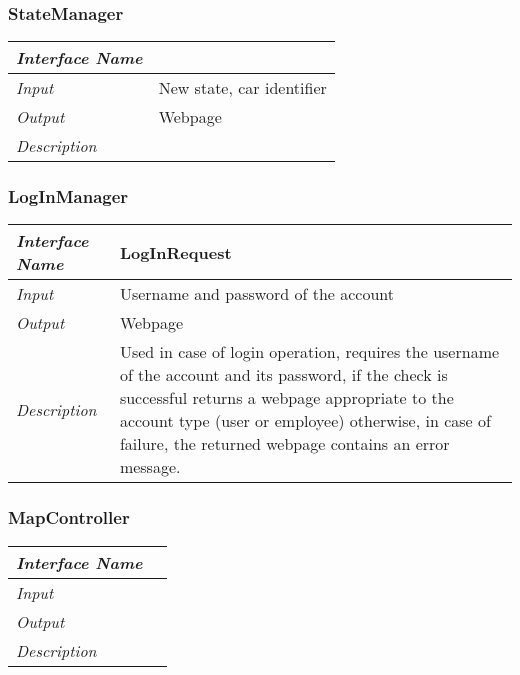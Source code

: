 \documentclass[11pt,a4paper]{report}
\begin{document}
\subsubsection{StateManager}
\begin{tabularx}{\textwidth}{|>{\em}l|X|}
	\hline
	Interface Name& \\
	\hline
	Input& New state, car identifier\\
	\hline
	Output & Webpage\\
	\hline
	Description &\\
	\hline
\end{tabularx}

\subsubsection{LogInManager}
\begin{tabularx}{\textwidth}{|>{\em}l|X|}
	\hline
	Interface Name& LogInRequest\\
	\hline
	Input & Username and password of the account\\
	\hline
	Output & Webpage\\
	\hline
	Description & Used in case of login operation, requires the username of the account and its password, if the check is successful returns a webpage appropriate to the account type (user or employee) otherwise, in case of failure, the returned webpage contains an error message.\\
	\hline
\end{tabularx}

\subsubsection{MapController}
\begin{tabularx}{\textwidth}{|>{\em}l|X|}
	\hline
	Interface Name& \\
	\hline
	Input & \\
	\hline
	Output & \\
	\hline
	Description &\\
	\hline
\end{tabularx}
\end{document}
